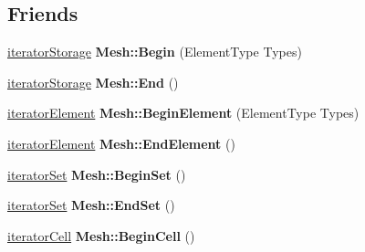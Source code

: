 \subsection*{Friends}
\begin{DoxyCompactItemize}
\item 
\hypertarget{classINMOST_1_1Mesh_1_1base__iterator_ace57fc663c2a237871b404139d498227}{\hyperlink{classINMOST_1_1Mesh_1_1base__iterator}{iterator\-Storage} {\bfseries Mesh\-::\-Begin} (Element\-Type Types)}\label{classINMOST_1_1Mesh_1_1base__iterator_ace57fc663c2a237871b404139d498227}

\item 
\hypertarget{classINMOST_1_1Mesh_1_1base__iterator_a671347dcf7323a73f73369df292e2921}{\hyperlink{classINMOST_1_1Mesh_1_1base__iterator}{iterator\-Storage} {\bfseries Mesh\-::\-End} ()}\label{classINMOST_1_1Mesh_1_1base__iterator_a671347dcf7323a73f73369df292e2921}

\item 
\hypertarget{classINMOST_1_1Mesh_1_1base__iterator_a0c8442749f880e9d2f422d006c79ef71}{\hyperlink{classINMOST_1_1Mesh_1_1base__iterator}{iterator\-Element} {\bfseries Mesh\-::\-Begin\-Element} (Element\-Type Types)}\label{classINMOST_1_1Mesh_1_1base__iterator_a0c8442749f880e9d2f422d006c79ef71}

\item 
\hypertarget{classINMOST_1_1Mesh_1_1base__iterator_aa83708600787bd5225c452d3dcfd5168}{\hyperlink{classINMOST_1_1Mesh_1_1base__iterator}{iterator\-Element} {\bfseries Mesh\-::\-End\-Element} ()}\label{classINMOST_1_1Mesh_1_1base__iterator_aa83708600787bd5225c452d3dcfd5168}

\item 
\hypertarget{classINMOST_1_1Mesh_1_1base__iterator_af7da87f6d660dbd35bc32640ae820634}{\hyperlink{classINMOST_1_1Mesh_1_1base__iterator}{iterator\-Set} {\bfseries Mesh\-::\-Begin\-Set} ()}\label{classINMOST_1_1Mesh_1_1base__iterator_af7da87f6d660dbd35bc32640ae820634}

\item 
\hypertarget{classINMOST_1_1Mesh_1_1base__iterator_a1e4a2a3197ab564fcaee7ef3e3f099f7}{\hyperlink{classINMOST_1_1Mesh_1_1base__iterator}{iterator\-Set} {\bfseries Mesh\-::\-End\-Set} ()}\label{classINMOST_1_1Mesh_1_1base__iterator_a1e4a2a3197ab564fcaee7ef3e3f099f7}

\item 
\hypertarget{classINMOST_1_1Mesh_1_1base__iterator_a61a3ce93e48e34ab4ed84150da7ea603}{\hyperlink{classINMOST_1_1Mesh_1_1base__iterator}{iterator\-Cell} {\bfseries Mesh\-::\-Begin\-Cell} ()}\label{classINMOST_1_1Mesh_1_1base__iterator_a61a3ce93e48e34ab4ed84150da7ea603}


\end{DoxyCompactItemize}
